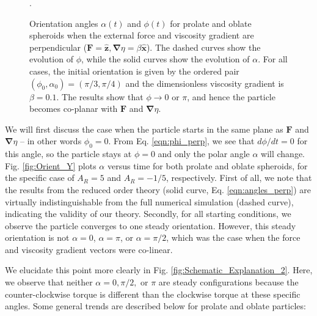 \documentclass{jfm}
\begin{document}
\begin{figure}
\centering
{}
\hfill
\caption{Orientation angles $\alpha(t)$ and $\phi(t)$ for prolate and oblate spheroids when the external force and viscosity gradient are perpendicular ($\boldsymbol{F} = \boldsymbol{\hat{z}}, \boldsymbol{\nabla}\eta = \beta \boldsymbol{\hat{x}}$).  The dashed curves show the evolution of $\phi$, while the solid curves show the evolution of $\alpha$. For all cases, the initial orientation is given by the ordered pair $(\phi_0,\alpha_0 )=(\pi/3,\pi/4)$ and the dimensionless viscosity gradient is $\beta =0.1$.  The results show that $\phi \rightarrow 0$ or $\pi$, and hence the particle becomes co-planar with $\boldsymbol{F}$ and $\boldsymbol{\nabla}\eta $.}.
\label{fig:Orient_Y_NoPlane}
\end{figure}

We will first discuss the case when the particle starts in the same plane as $\boldsymbol{F}$ and $\boldsymbol{\nabla} \eta$ – in other words $\phi_0 = 0$.  From Eq. \eqref{eqn:phi_perp}, we see that $d \phi/dt = 0$ for this angle, so the particle stays at $\phi = 0$ and only the polar angle $\alpha$ will change.  Fig. \ref{fig:Orient_Y} plots $\alpha$ versus time for both prolate and oblate spheroids, for the specific case of $A_R = 5$ and $A_R = -1/5$, respectively.  First of all, we note that the results from the reduced order theory (solid curve, Eq. \eqref{eqn:angles_perp}) are virtually indistinguishable from the full numerical simulation (dashed curve), indicating the validity of our theory.  Secondly, for all starting conditions, we observe the particle converges to one steady orientation.  However, this steady orientation is not $\alpha =0$, $\alpha = \pi$, or $\alpha =\pi/2$, which was the case when the force and viscosity gradient vectors were co-linear.

We elucidate this point more clearly in Fig. \ref{fig:Schematic_Explanation_2}. Here, we observe that neither $\alpha =0,\pi/2,$ or $\pi$ are steady configurations because the counter-clockwise torque is different than the clockwise torque at these specific angles.  Some general trends are described below for prolate and oblate particles:
\end{document}

